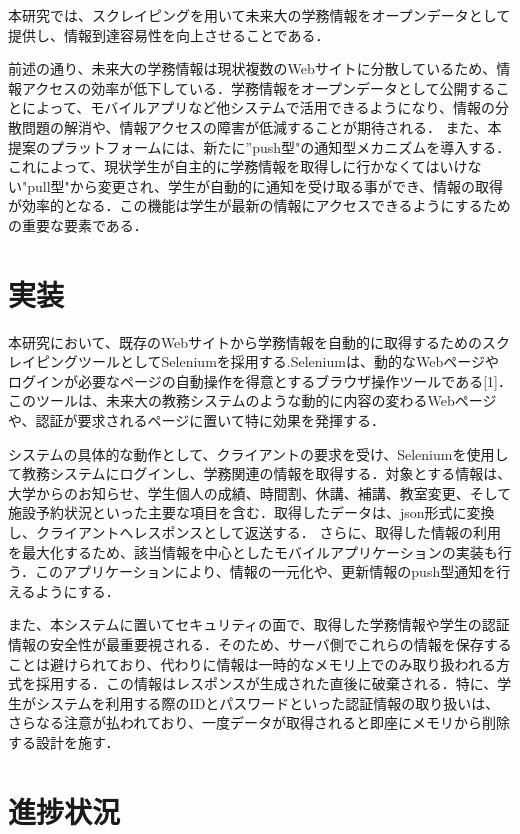 \documentclass[11pt]{ujarticle}
\begin{document}
本研究では、スクレイピングを用いて未来大の学務情報をオープンデータとして提供し、情報到達容易性を向上させることである．

前述の通り、未来大の学務情報は現状複数のWebサイトに分散しているため、情報アクセスの効率が低下している．学務情報をオープンデータとして公開することによって、モバイルアプリなど他システムで活用できるようになり、情報の分散問題の解消や、情報アクセスの障害が低減することが期待される．
また、本提案のプラットフォームには、新たに”push型"の通知型メカニズムを導入する．これによって、現状学生が自主的に学務情報を取得しに行かなくてはいけない"pull型"から変更され、学生が自動的に通知を受け取る事ができ、情報の取得が効率的となる．この機能は学生が最新の情報にアクセスできるようにするための重要な要素である．


\section{実装}

本研究において、既存のWebサイトから学務情報を自動的に取得するためのスクレイピングツールとしてSeleniumを採用する.Seleniumは、動的なWebページやログインが必要なページの自動操作を得意とするブラウザ操作ツールである[1]．このツールは、未来大の教務システムのような動的に内容の変わるWebページや、認証が要求されるページに置いて特に効果を発揮する．

システムの具体的な動作として、クライアントの要求を受け、Seleniumを使用して教務システムにログインし、学務関連の情報を取得する．対象とする情報は、大学からのお知らせ、学生個人の成績、時間割、休講、補講、教室変更、そして施設予約状況といった主要な項目を含む．取得したデータは、json形式に変換し、クライアントへレスポンスとして返送する．
さらに、取得した情報の利用を最大化するため、該当情報を中心としたモバイルアプリケーションの実装も行う．このアプリケーションにより、情報の一元化や、更新情報のpush型通知を行えるようにする．

また、本システムに置いてセキュリティの面で、取得した学務情報や学生の認証情報の安全性が最重要視される．そのため、サーバ側でこれらの情報を保存することは避けられており、代わりに情報は一時的なメモリ上でのみ取り扱われる方式を採用する．この情報はレスポンスが生成された直後に破棄される．特に、学生がシステムを利用する際のIDとパスワードといった認証情報の取り扱いは、さらなる注意が払われており、一度データが取得されると即座にメモリから削除する設計を施す．

\section{進捗状況}
\end{document}
